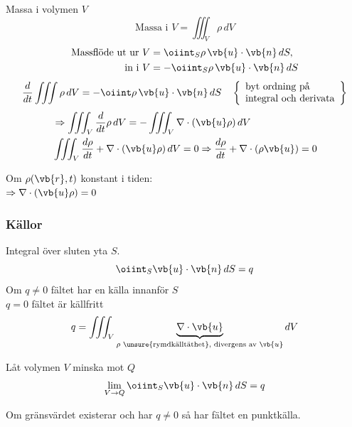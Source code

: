 Massa i volymen $V$
\[ \text{Massa i } V = \iiint_V \rho\,dV \]
\begin{align*}
\text{Massflöde ut ur } V &= \oiint_S \rho\,\vb{u} \cdot \vb{n}\,dS, \\
\text{in i } V &= -\oiint_S \rho\,\vb{u} \cdot \vb{n}\,dS
\end{align*}
\[ \frac{d}{dt} \iiint \rho\,dV = -\oiint \rho\,\vb{u} \cdot \vb{n}\,dS \quad \left\{ \begin{array}{l} \text{byt ordning på} \\ \text{integral och derivata} \end{array} \right\} \]
\begin{align*}
&\Rightarrow \iiint_V \frac{d}{dt}\rho\,dV = -\iiint_V \nabla \cdot (\vb{u}\rho)\,dV \\
&\iiint_V \frac{d\rho}{dt} + \nabla \cdot (\vb{u}\rho)\,dV = 0 \Rightarrow \frac{d\rho}{dt} + \nabla \cdot (\rho\vb{u}) = 0
\end{align*}

Om $\rho(\vb{r}, t)$ konstant i tiden:\\
$\Rightarrow \nabla \cdot (\vb{u}\rho) = 0$

\subsubsection*{Källor}
Integral över sluten yta $S$.
\[ \oiint_S \vb{u} \cdot \vb{n}\,dS = q \]
Om $q \neq 0$ fältet har en källa innanför $S$\\
\phantom{Om} $q = 0$ fältet är källfritt
\[ q = \iiint_V \underbrace{\nabla \cdot \vb{u}}_{\rho \text{ \unsure{rymdkälltäthet}, divergens av } \vb{u}} dV \]

\begin{minipage}{0.22\linewidth}
\end{minipage}
\begin{minipage}{0.76\linewidth}
Låt volymen $V$ minska mot $Q$
\[ \lim_{V \to Q} \oiint_S \vb{u} \cdot \vb{n}\,dS = q \]
\end{minipage}

Om gränsvärdet existerar och har $q \neq 0$ så har fältet en punktkälla.
